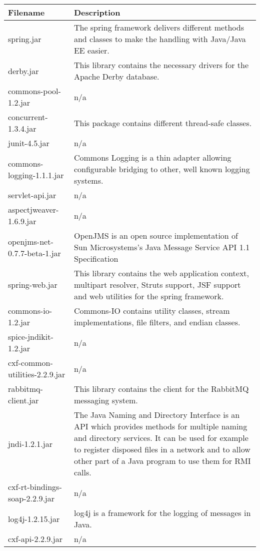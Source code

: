 \begin{center}
\begin{longtable}{|p{}|p{}|}
\hline 
Filename & Description\\
\hline
\hline 
spring.jar & The spring framework delivers different methods and classes to make the handling with Java/Java EE easier.\\
\hline 
derby.jar & This library contains the necessary drivers for the Apache Derby database.\\
\hline 
commons-pool-1.2.jar & n/a\\
\hline 
concurrent-1.3.4.jar & This package contains different thread-safe classes.\\
\hline 
junit-4.5.jar & n/a\\
\hline 
commons-logging-1.1.1.jar & Commons Logging is a thin adapter allowing configurable bridging to other, well known logging systems.\\
\hline 
servlet-api.jar & n/a\\
\hline 
aspectjweaver-1.6.9.jar & n/a\\
\hline 
openjms-net-0.7.7-beta-1.jar & OpenJMS is an open source implementation of Sun Microsystems's Java Message Service API 1.1 Specification\\
\hline 
spring-web.jar & This library contains the web application context, multipart resolver, Struts support, JSF support and web utilities for the spring framework.\\
\hline 
commons-io-1.2.jar & Commons-IO contains utility classes, stream implementations, file filters, and endian classes.\\
\hline 
spice-jndikit-1.2.jar & n/a\\
\hline 
cxf-common-utilities-2.2.9.jar & n/a\\
\hline 
rabbitmq-client.jar & This library contains the client for the RabbitMQ messaging system.\\
\hline 
jndi-1.2.1.jar & The Java Naming and Directory Interface is an API which provides methods for multiple naming and directory services. It can be used for example to register disposed files in a network and to allow other part of a Java program to use them for RMI calls.\\
\hline 
cxf-rt-bindings-soap-2.2.9.jar & n/a\\
\hline 
log4j-1.2.15.jar & log4j is a framework for the logging of messages in Java.\\
\hline 
cxf-api-2.2.9.jar & n/a\\

\end{longtable}
\end{center}

